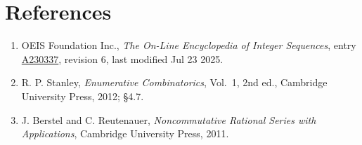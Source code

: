 \documentclass[11pt]{article}
\theoremstyle{definition}
\begin{document}
\section{References}

\begin{enumerate}

\item OEIS Foundation Inc., \emph{The On-Line Encyclopedia of Integer Sequences}, entry \href{https://oeis.org/A230337}{A230337}, revision 6, last modified Jul 23 2025.

\item R. P. Stanley, \emph{Enumerative Combinatorics}, Vol.~1, 2nd ed., Cambridge University Press, 2012; \S4.7.

\item J. Berstel and C. Reutenauer, \emph{Noncommutative Rational Series with Applications}, Cambridge University Press, 2011.

\end{enumerate}
\end{document}
